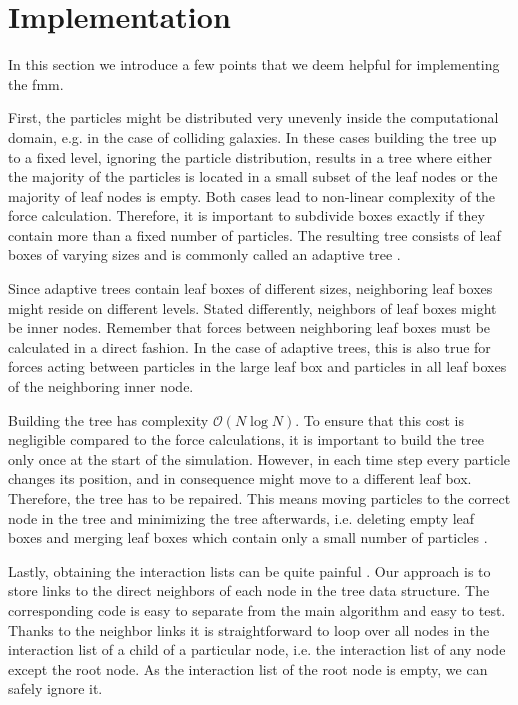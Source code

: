 \section{Implementation}
\label{implementation}

In this section we introduce a few points that we deem helpful for implementing the \gls{fmm}.

First, the particles might be distributed very unevenly inside the computational domain, e.g. in the case of colliding galaxies.
In these cases building the tree up to a fixed level, ignoring the particle distribution, results in a tree where either the majority of the particles is located in a small subset of the leaf nodes or the majority of leaf nodes is empty.
Both cases lead to non-linear complexity of the force calculation.
Therefore, it is important to subdivide boxes exactly if they contain more than a fixed number of particles.
The resulting tree consists of leaf boxes of varying sizes and is commonly called an adaptive tree \cite{short-course}.

Since adaptive trees contain leaf boxes of different sizes, neighboring leaf boxes might reside on different levels.
Stated differently, neighbors of leaf boxes might be inner nodes.
Remember that forces between neighboring leaf boxes must be calculated in a direct fashion.
In the case of adaptive trees, this is also true for forces acting between particles in the large leaf box and particles in all leaf boxes of the neighboring inner node.

Building the tree has complexity $\mathcal{O}(N \log N)$.
To ensure that this cost is negligible compared to the force calculations, it is important to build the tree only once at the start of the simulation.
However, in each time step every particle changes its position, and in consequence might move to a different leaf box.
Therefore, the tree has to be repaired.
This means moving particles to the correct node in the tree and minimizing the tree afterwards, i.e. deleting empty leaf boxes and merging leaf boxes which contain only a small number of particles \cite{griebel2007numerical}.

Lastly, obtaining the interaction lists can be quite painful \cite{SicchaSeminar}.
Our approach is to store links to the direct neighbors of each node in the tree data structure.
The corresponding code is easy to separate from the main algorithm and easy to test.
Thanks to the neighbor links it is straightforward to loop over all nodes in the interaction list of a child of a particular node, i.e. the interaction list of any node except the root node.
As the interaction list of the root node is empty, we can safely ignore it.
